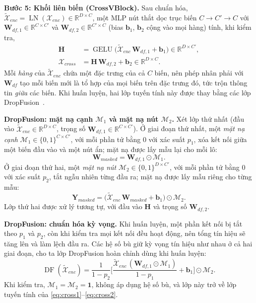 \documentclass[conference]{IEEEtran}
\newcommand{\R}{\mathbb{R}}
\newcommand{\one}{\mathbf{1}}
\newcommand{\LN}{\operatorname{LN}}
\newcommand{\GELU}{\operatorname{GELU}}
\newcommand{\DF}{\operatorname{DF}}
\begin{document}
\textbf{Bước 5: Khối liên biến (CrossVBlock).} Sau chuẩn hóa,
$\tilde{\mathcal{X}}_{enc}=\LN(\mathcal{X}_{enc})\in\R^{D\times C}$, một MLP nút thắt dọc trục biến $C\to C'\to C$ với
$\mathbf{W}_{df,1}\in\R^{C\times C'}$ và $\mathbf{W}_{df,2}\in\R^{C'\times C}$ (bias $\mathbf{b}_1$, $\mathbf{b}_2$ cộng
vào mọi hàng) tính, khi kiểm tra,
\begin{align}
\mathbf{H}&=\GELU\big(\tilde{\mathcal{X}}_{enc}\,\mathbf{W}_{df,1}+\mathbf{b}_1\big)\in\R^{D\times C'},\label{eq:cross1}\\
\mathcal{X}_{cross}&=\mathbf{H}\,\mathbf{W}_{df,2}+\mathbf{b}_2\in\R^{D\times C}.\label{eq:cross2}
\end{align}
Mỗi \emph{hàng} của $\tilde{\mathcal{X}}_{enc}$ chứa một đặc trưng của cả $C$ biến, nên phép nhân phải với $\mathbf{W}_{df}$ tạo
mỗi biến mới là tổ hợp của mọi biến trên đặc trưng đó, tức trộn thông tin \emph{giữa} các biến. Khi huấn luyện, hai lớp
tuyến tính này được thay bằng các lớp DropFusion~\cite{Chen2026DyTimeNet}.

\textbf{DropFusion: mặt nạ cạnh $\mathcal{M}_1$ và mặt nạ nút $\mathcal{M}_2$.} Xét lớp thứ nhất (đầu vào
$\tilde{\mathcal{X}}_{enc}\in\R^{D\times C}$, trọng số $\mathbf{W}_{df,1}\in\R^{C\times C'}$). Ở giai đoạn thứ nhất, một
\emph{mặt nạ cạnh} $\mathcal{M}_1\in\{0,1\}^{C\times C'}$, với mỗi phần tử bằng 0 với xác suất $p_1$, xóa kết nối giữa
một biến đầu vào và một nút ẩn; mặt nạ được lấy mẫu lại cho mỗi lô:
\begin{equation}
\mathbf{W}_{masked}=\mathbf{W}_{df,1}\odot\mathcal{M}_1 .
\label{eq:wmasked}
\end{equation}
Ở giai đoạn thứ hai, một \emph{mặt nạ nút} $\mathcal{M}_2\in\{0,1\}^{D\times C'}$, với mỗi phần tử bằng 0 với xác suất
$p_2$, tắt ngẫu nhiên từng đầu ra; mặt nạ được lấy mẫu riêng cho từng mẫu:
\begin{equation}
\mathbf{Y}_{masked}=\big(\tilde{\mathcal{X}}_{enc}\,\mathbf{W}_{masked}+\mathbf{b}_1\big)\odot\mathcal{M}_2 .
\label{eq:ymasked}
\end{equation}
Lớp thứ hai được xử lý tương tự, với đầu vào $\mathbf{H}$ và trọng số $\mathbf{W}_{df,2}$.

\textbf{DropFusion: chuẩn hóa kỳ vọng.} Khi huấn luyện, một phần kết nối bị tắt theo $p_1$ và $p_2$, còn khi kiểm tra mọi
kết nối đều hoạt động, nên tổng tín hiệu sẽ tăng lên và làm lệch đầu ra. Các hệ số bù giữ kỳ vọng tín hiệu như nhau ở cả
hai giai đoạn, cho ta lớp DropFusion hoàn chỉnh dùng khi huấn luyện:
\begin{equation}
\DF(\tilde{\mathcal{X}}_{enc})=\frac{1}{1-p_2}\Big[\frac{\tilde{\mathcal{X}}_{enc}\,(\mathbf{W}_{df,1}\odot\mathcal{M}_1)}{1-p_1}
+\mathbf{b}_1\Big]\odot\mathcal{M}_2 .
\label{eq:dropfusion}
\end{equation}
Khi kiểm tra, $\mathcal{M}_1=\mathcal{M}_2=\one$, không áp dụng hệ số bù, và lớp này trở về lớp tuyến tính
của \eqref{eq:cross1}--\eqref{eq:cross2}.
\end{document}
